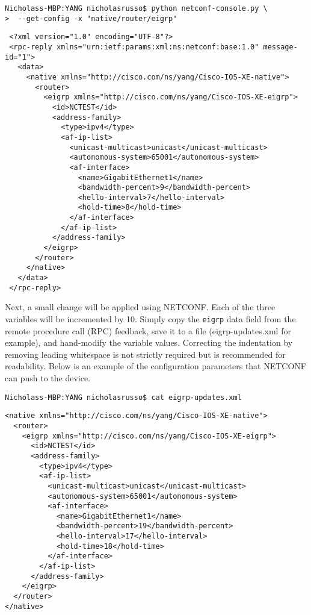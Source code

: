 \begin{verbatim}
Nicholass-MBP:YANG nicholasrusso$ python netconf-console.py \
>  --get-config -x "native/router/eigrp"
\end{verbatim}

\begin{verbatim}
 <?xml version="1.0" encoding="UTF-8"?>
 <rpc-reply xmlns="urn:ietf:params:xml:ns:netconf:base:1.0" message-id="1">
   <data>
     <native xmlns="http://cisco.com/ns/yang/Cisco-IOS-XE-native">
       <router>
         <eigrp xmlns="http://cisco.com/ns/yang/Cisco-IOS-XE-eigrp">
           <id>NCTEST</id>
           <address-family>
             <type>ipv4</type>
             <af-ip-list>
               <unicast-multicast>unicast</unicast-multicast>
               <autonomous-system>65001</autonomous-system>
               <af-interface>
                 <name>GigabitEthernet1</name>
                 <bandwidth-percent>9</bandwidth-percent>
                 <hello-interval>7</hello-interval>
                 <hold-time>8</hold-time>
               </af-interface>
             </af-ip-list>
           </address-family>
         </eigrp>
       </router>
     </native>
   </data>
 </rpc-reply>
\end{verbatim}

Next, a small change will be applied using NETCONF\@. Each of the three
variables will be incremented by 10. Simply copy the \verb|eigrp| data field from
the remote procedure call (RPC) feedback, save it to a file (eigrp-updates.xml
for example), and hand-modify the variable values. Correcting the indentation
by removing leading whitespace is not strictly required but is recommended for
readability. Below is an example of the configuration parameters that NETCONF
can push to the device.

\begin{verbatim}
Nicholass-MBP:YANG nicholasrusso$ cat eigrp-updates.xml
\end{verbatim}

\begin{verbatim}
<native xmlns="http://cisco.com/ns/yang/Cisco-IOS-XE-native">
  <router>
    <eigrp xmlns="http://cisco.com/ns/yang/Cisco-IOS-XE-eigrp">
      <id>NCTEST</id>
      <address-family>
        <type>ipv4</type>
        <af-ip-list>
          <unicast-multicast>unicast</unicast-multicast>
          <autonomous-system>65001</autonomous-system>
          <af-interface>
            <name>GigabitEthernet1</name>
            <bandwidth-percent>19</bandwidth-percent>
            <hello-interval>17</hello-interval>
            <hold-time>18</hold-time>
          </af-interface>
        </af-ip-list>
      </address-family>
    </eigrp>
  </router>
</native>
\end{verbatim}

